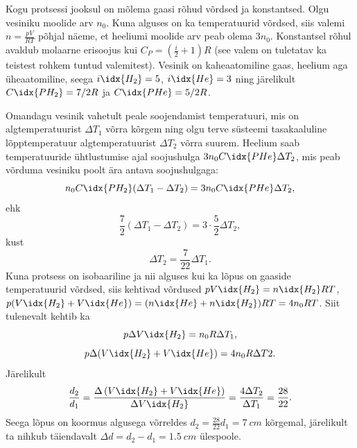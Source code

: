 \solu
Kogu protsessi jooksul on mõlema gaasi rõhud võrdsed ja konstantsed. Olgu vesiniku moolide arv $n_0$. Kuna alguses on ka temperatuurid võrdsed, siis valemi $n = \frac{pV}{RT}$ põhjal näeme, et heeliumi moolide arv peab olema $3n_0$. Konstantsel rõhul avaldub molaarne erisoojus kui $C_P = \left(\frac{i}{2} + 1\right) R$ (see valem on tuletatav ka teistest rohkem tuntud valemitest). Vesinik on kaheaatomiline gaas, heelium aga üheaatomiline, seega $i\idx{H_2} = 5$, $i\idx{He} = 3$ ning järelikult $C\idx{PH_2} = 7/2R$ ja $C\idx{PHe} = 5/2R$.

Omandagu vesinik vahetult peale soojendamist temperatuuri, mis on algtemperatuurist $\Delta T_1$ võrra kõrgem ning olgu terve süsteemi tasakaaluline lõpptemperatuur algtemperatuurist $\Delta T_2$ võrra suurem. Heelium saab temperatuuride ühtlustumise ajal soojushulga $3n_0C\idx{PHe}\Delta T_2$, mis peab võrduma vesiniku poolt ära antava soojushulgaga:
\[
n_0C\idx{PH_2} (\Delta T_1 - \Delta T_2) = 3n_0C\idx{PHe}\Delta T_2,
\]
ehk
\[
\frac{7}{2} (\Delta T_1 - \Delta T_2) = 3 \cdot \frac{5}{2} \Delta T_2,
\]
kust
\[
\Delta T_2 = \frac{7}{22} \Delta T_1.
\]
Kuna protsess on isobaariline ja nii alguses kui ka lõpus on gaaside temperatuurid võrdsed, siis kehtivad võrdused $pV\idx{H_2} = n\idx{H_2}RT$, $p(V\idx{H_2} + V\idx{He}) = (n\idx{He} + n\idx{H_2} )RT = 4n_0RT$. Siit tulenevalt kehtib ka
\[
p\Delta V\idx{H_2} = n_0R\Delta T_1,
\]
\[
p\Delta (V\idx{H_2} + V\idx{He}) = 4n_0R\Delta T2.
\]
Järelikult
\[
\frac{d_{2}}{d_{1}}=\frac{\Delta\left(V\idx{H_{2}}+V\idx{H e}\right)}{\Delta V\idx{H_{2}}}=\frac{4 \Delta T_{2}}{\Delta T_{1}}=\frac{28}{22}.
\]
Seega lõpus on koormus algusega võrreldes $d_2 = \frac{28}{22} d_1 = \SI{7}{cm}$ kõrgemal, järelikult ta nihkub täiendavalt $\Delta d = d_2 - d_1 = \SI{1,5}{cm}$ ülespoole.
\probend